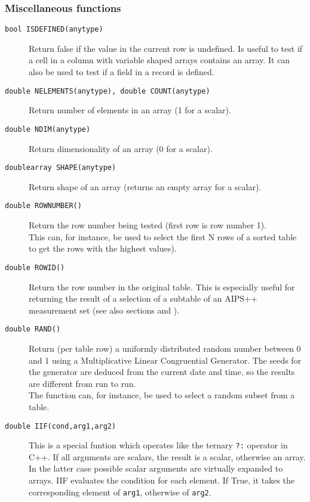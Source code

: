 \subsubsection{Miscellaneous functions}
\begin{description}
  \item[ \texttt{bool ISDEFINED(anytype)}]
    Return false if the value in the current row is undefined. Is
    useful to test if a cell in a column with variable shaped arrays
    contains an array. It can also be used to test if a field in a
    record is defined.
  \item[ \texttt{double NELEMENTS(anytype), double COUNT(anytype)}]
    Return number of elements in an array (1 for a scalar).
  \item[ \texttt{double NDIM(anytype)}]
    Return dimensionality of an array (0 for a scalar).
  \item[ \texttt{doublearray SHAPE(anytype)}]
    Return shape of an array (returns an empty array for a scalar).
  \item[ \texttt{double ROWNUMBER()}]
       Return the row number being tested (first row is row number 1).
       \\This can, for instance, be used to select the first N rows
       of a sorted table to get the rows with the highest values).
  \item[ \texttt{double ROWID()}]
       Return the row number in the original table. This is especially
       useful for returning the result of a selection of a subtable
       of an AIPS++ measurement set
       (see also sections 
       and ).
  \item[ \texttt{double RAND()}]
       Return (per table row) a uniformly distributed random number
       between 0 and 1 using a Multiplicative Linear Congruential Generator.
       The seeds for the generator are deduced from the current date and
       time, so the results are different from run to run.
       \\The function can, for instance, be used to select a random
       subset from a table.
  \item[ \texttt{double IIF(cond,arg1,arg2)}]
       This is a special funtion which operates like the ternary \texttt{?:}
       operator in C++. 
       If all arguments are scalars, the result is a scalar, otherwise
       an array. In the latter case possible scalar arguments are
       virtually expanded to arrays.
       IIF evaluates the condition for each element. If True, it takes
       the corresponding element of \texttt{arg1}, otherwise of \texttt{arg2}.
\end{description}

